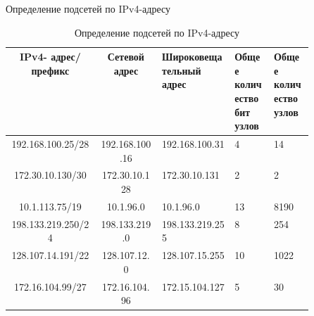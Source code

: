 \documentclass[a4paper,14pt]{extarticle}
\begin{document}
\begin{mypart}{Определение подсетей по IPv4-адресу}
	
	\begin{table}[htbp]
		\small
		\centering
		\caption{Определение подсетей по IPv4-адресу}
		\begin{tabular}{|c|c|p{0.24\linewidth}|p{0.13\linewidth}|p{0.13\linewidth}|}
			\hline
			
			\textbf{IPv4-
			адрес/префикс} & 
			
			\textbf{Сетевой адрес} & 
			\textbf{Широковещательный адрес} & \textbf{Общее количество бит узлов}& \textbf{Общее количество узлов} \\ \hline
			192.168.100.25/28 & 192.168.100.16 & 192.168.100.31 & 4 & 14 \\ \hline
			172.30.10.130/30 & 172.30.10.128 & 172.30.10.131 & 2 & 2 \\ \hline
			10.1.113.75/19 & 10.1.96.0 & 10.1.96.0 & 13 & 8190 \\ \hline
			198.133.219.250/24 & 198.133.219.0 & 198.133.219.255 & 8 & 254 \\ \hline
			128.107.14.191/22 & 128.107.12.0 & 128.107.15.255 & 10 & 1022 \\ \hline
			172.16.104.99/27 & 172.16.104.96 & 172.15.104.127 & 5 & 30 \\ \hline
		\end{tabular}
		\label{tab:subnets}
	\end{table}
	
\end{mypart}
\end{document}
